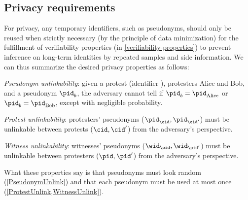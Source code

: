 \subsection{Privacy requirements}%
\label{privacy-properties}

For privacy, any temporary identifiers, such as pseudonyms, should only be 
reused when strictly necessary (by the principle of data minimization) for the 
fulfillment of verifiability properties (in \cref{verifiability-properties}) to 
prevent inference on long-term identities by repeated samples and side 
information.
We can thus summarize the desired privacy properties as follows:
\begin{requirements}[P]
\item\label{PseudonymUnlink} \emph{Pseudonym unlinkability}: given a protest 
  (identifier \cid), protesters Alice and Bob, and a pseudonym \(\pid_b\), the 
  adversary cannot tell if \(\pid_b = \pid_{\text{Alice}}\) or \(\pid_b = 
    \pid_{\text{Bob}}\), except with negligible probability.
\item\label{ProtestUnlink} \emph{Protest unlinkability}: protesters' pseudonyms 
  (\(\pid_\cid, \pid_{\cid'}\)) must be unlinkable between protests (\(\cid, 
    \cid'\)) from the adversary's perspective.
\item\label{WitnessUnlink}\emph{Witness unlinkability}:  witnesses' pseudonyms 
  (\(\wid_\pid, \wid_{\pid'}\)) must be unlinkable between protesters (\(\pid, 
    \pid'\)) from the adversary's perspective.
\end{requirements}

What these properties say is that pseudonyms must look random 
(\cref{PseudonymUnlink}) and that each pseudonym must be used at most once 
(\cref{ProtestUnlink,WitnessUnlink}).
